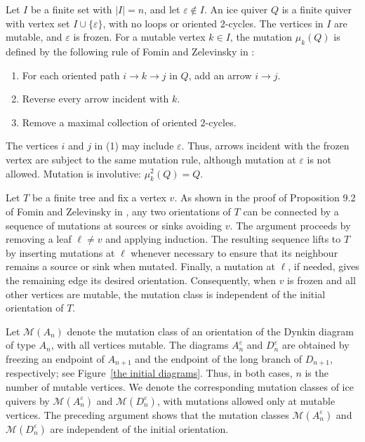 \documentclass[a4paper, 12pt, reqno]{amsart}
\theoremstyle{definition}
\begin{document}
Let $I$ be a finite set with $|I|=n$, and let $\varepsilon\notin I$. An ice quiver $Q$ is a finite quiver with vertex set $I\cup\{\varepsilon\}$, with no loops or oriented $2$-cycles. The vertices in $I$ are mutable, and $\varepsilon$ is frozen. For a mutable vertex $k\in I$, the mutation $\mu_k(Q)$ is defined by the following rule of Fomin and Zelevinsky in \cite{FZ2002}:
\begin{enumerate}
  \item[(1)] For each oriented path $i\longrightarrow k\longrightarrow j$ in $Q$, add an arrow $i\longrightarrow j$.

  \item[(2)] Reverse every arrow incident with $k$.

  \item[(3)] Remove a maximal collection of oriented $2$-cycles.
\end{enumerate}
The vertices $i$ and $j$ in (1) may include $\varepsilon$. Thus, arrows incident with the frozen vertex are subject to the same mutation rule, although mutation at $\varepsilon$ is not allowed. Mutation is involutive: $\mu_k^2(Q)=Q$. %


Let $T$ be a finite tree and fix a vertex $v$. As shown in the proof of Proposition 9.2 of Fomin and Zelevinsky in \cite{FZ2003}, any two orientations of $T$ can be connected by a sequence of mutations at sources or sinks avoiding $v$. The argument proceeds by removing a leaf $\ell\ne v$ and applying induction. The resulting sequence lifts to $T$ by inserting mutations at $\ell$ whenever necessary to ensure that its neighbour remains a source or sink when mutated. Finally, a mutation at $\ell$, if needed, gives the remaining edge its desired orientation. Consequently, when $v$ is frozen and all other vertices are mutable, the mutation class is independent of the initial orientation of $T$.


Let $\mathcal{M}(A_n)$ denote the mutation class of an orientation of the Dynkin diagram of type $A_n$, with all vertices mutable. The diagrams $A_n^\varepsilon$ and $D_n^\varepsilon$ are obtained by freezing an endpoint of $A_{n+1}$ and the endpoint of the long branch of $D_{n+1}$, respectively; see Figure~\ref{the initial diagrams}. Thus, in both cases, $n$ is the number of mutable vertices. We denote the corresponding mutation classes of ice quivers by $\mathcal{M}(A_n^\varepsilon)$ and $\mathcal{M}(D_n^\varepsilon)$, with mutations allowed only at mutable vertices. The preceding argument shows that the mutation classes $\mathcal{M}(A_n^\varepsilon)$ and $\mathcal{M}(D_n^\varepsilon)$ are independent of the initial orientation. 
\end{document}
